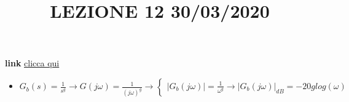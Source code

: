 \title{LEZIONE 12 30/03/2020}\newline
\textbf{link} \href{https://web.microsoftstream.com/video/22a546ac-3e6b-43e0-b0f9-45a630661700?list=user&userId=faa91214-a6f5-40d7-8875-253fd49b8ce1}{clicca qui}
\begin{itemize}
    \item $G_b(s)= \frac{1}{s^g} \rightarrow G(j \omega) = \frac{1}{(j \omega)^g} \rightarrow \begin{cases}
        |G_b(j \omega)| = \frac{1}{\omega^g} \rightarrow |G_b(j \omega)|_{dB}= - 20 g log(\omega)
    \end{cases} $
\end{itemize}